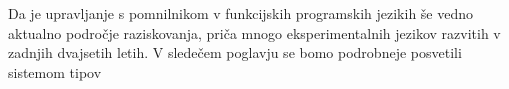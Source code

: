 Da je upravljanje s pomnilnikom v funkcijskih programskih jezikih še vedno aktualno področje raziskovanja, priča mnogo eksperimentalnih jezikov razvitih v zadnjih dvajsetih letih. V sledečem poglavju se bomo podrobneje posvetili sistemom tipov 




